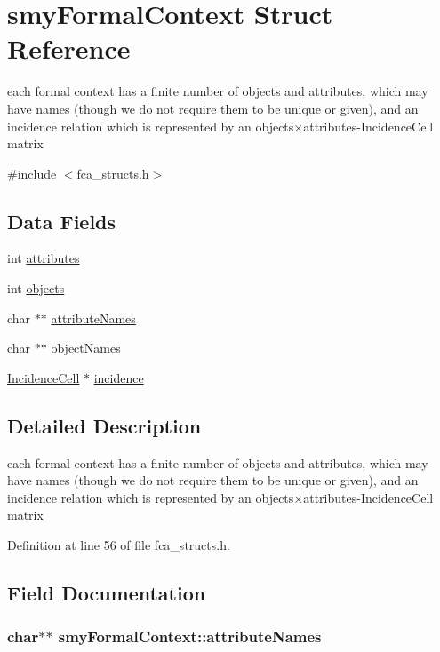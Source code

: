 \hypertarget{structsmyFormalContext}{\section{smy\-Formal\-Context \-Struct \-Reference}
\label{structsmyFormalContext}
}


each formal context has a finite number of objects and attributes, which may have names (though we do not require them to be unique or given), and an incidence relation which is represented by an objects×attributes-\/\-Incidence\-Cell matrix  




{\ttfamily \#include $<$fca\-\_\-structs.\-h$>$}

\subsection*{\-Data \-Fields}
\begin{DoxyCompactItemize}
\item 
int \hyperlink{structsmyFormalContext_a4ae89e8f42fd7feab4db872cd8472b5e}{attributes}
\item 
int \hyperlink{structsmyFormalContext_ab6e220297887bc2af0e612c94132ceb3}{objects}
\item 
char $\ast$$\ast$ \hyperlink{structsmyFormalContext_a731e638aa85ebc11076f9e17ada14c29}{attribute\-Names}
\item 
char $\ast$$\ast$ \hyperlink{structsmyFormalContext_a732a2615921f2d209fb7d9341df2c183}{object\-Names}
\item 
\hyperlink{fca_8h_a92fa84ef7a12663bb998f141ab729056}{\-Incidence\-Cell} $\ast$ \hyperlink{structsmyFormalContext_a55d9d4c2e38c3571e9f6e870bc1c06b8}{incidence}
\end{DoxyCompactItemize}


\subsection{\-Detailed \-Description}
each formal context has a finite number of objects and attributes, which may have names (though we do not require them to be unique or given), and an incidence relation which is represented by an objects×attributes-\/\-Incidence\-Cell matrix 

\-Definition at line 56 of file fca\-\_\-structs.\-h.



\subsection{\-Field \-Documentation}
\hypertarget{structsmyFormalContext_a731e638aa85ebc11076f9e17ada14c29}{
\subsubsection[{attribute\-Names}]{\setlength{\rightskip}{0pt plus 5cm}char$\ast$$\ast$ {\bf smy\-Formal\-Context\-::attribute\-Names}}}\label{structsmyFormalContext_a731e638aa85ebc11076f9e17ada14c29}


